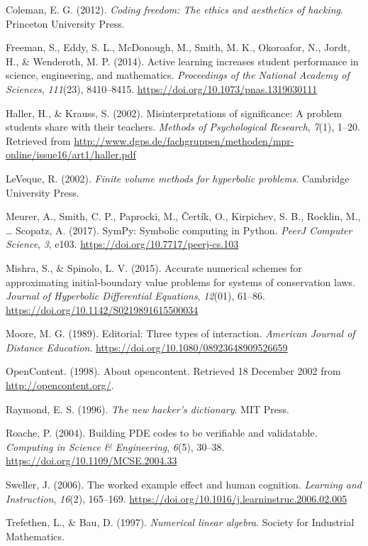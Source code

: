 \documentclass[]{book}
\begin{document}
\hypertarget{ref-coleman2012coding}{}
Coleman, E. G. (2012). \emph{Coding freedom: The ethics and aesthetics
of hacking}. Princeton University Press.

\hypertarget{ref-freeman2014active}{}
Freeman, S., Eddy, S. L., McDonough, M., Smith, M. K., Okoroafor, N.,
Jordt, H., \& Wenderoth, M. P. (2014). Active learning increases student
performance in science, engineering, and mathematics. \emph{Proceedings
of the National Academy of Sciences}, \emph{111}(23), 8410--8415.
\url{https://doi.org/10.1073/pnas.1319030111}

\hypertarget{ref-HallerKrauss2002}{}
Haller, H., \& Krauss, S. (2002). Misinterpretations of significance: A
problem students share with their teachers. \emph{Methods of
Psychological Research}, \emph{7}(1), 1--20. Retrieved from
\url{http://www.dgps.de/fachgruppen/methoden/mpr-online/issue16/art1/haller.pdf}

\hypertarget{ref-leveque2002finite}{}
LeVeque, R. (2002). \emph{Finite volume methods for hyperbolic
problems}. Cambridge University Press.

\hypertarget{ref-Meurer2017}{}
Meurer, A., Smith, C. P., Paprocki, M., Čertík, O., Kirpichev, S. B.,
Rocklin, M., \ldots{} Scopatz, A. (2017). SymPy: Symbolic computing in
Python. \emph{PeerJ Computer Science}, \emph{3}, e103.
\url{https://doi.org/10.7717/peerj-cs.103}

\hypertarget{ref-mishra2015accurate}{}
Mishra, S., \& Spinolo, L. V. (2015). Accurate numerical schemes for
approximating initial-boundary value problems for systems of
conservation laws. \emph{Journal of Hyperbolic Differential Equations},
\emph{12}(01), 61--86. \url{https://doi.org/10.1142/S0219891615500034}

\hypertarget{ref-moore1989three}{}
Moore, M. G. (1989). Editorial: Three types of interaction.
\emph{American Journal of Distance Education}.
\url{https://doi.org/10.1080/08923648909526659}

\hypertarget{ref-OC1998}{}
OpenContent. (1998). About opencontent. Retrieved 18 December 2002 from
\url{http://opencontent.org/}.

\hypertarget{ref-raymond1996new}{}
Raymond, E. S. (1996). \emph{The new hacker's dictionary}. MIT Press.

\hypertarget{ref-roache2004bpc}{}
Roache, P. (2004). Building PDE codes to be verifiable and validatable.
\emph{Computing in Science \& Engineering}, \emph{6}(5), 30--38.
\url{https://doi.org/10.1109/MCSE.2004.33}

\hypertarget{ref-sweller2006worked}{}
Sweller, J. (2006). The worked example effect and human cognition.
\emph{Learning and Instruction}, \emph{16}(2), 165--169.
\url{https://doi.org/10.1016/j.learninstruc.2006.02.005}

\hypertarget{ref-trefethen1997numerical}{}
Trefethen, L., \& Bau, D. (1997). \emph{Numerical linear algebra}.
Society for Industrial Mathematics.
\end{document}
